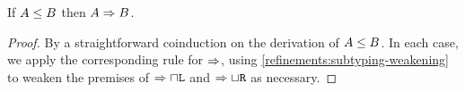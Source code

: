 \begin{theorem}
  If $A \le B$ then $A \mathrel\Rightarrow B$.
\end{theorem}
\begin{proof}
  By a straightforward coinduction on the derivation of $A \le B$. In each case, we apply the corresponding rule for $\mathrel\Rightarrow$, using \cref{refinements:subtyping-weakening} to weaken the premises of $\mathrel\Rightarrow{\mathbin{\sqcap}\texttt{L}}$ and $\mathrel\Rightarrow{\mathbin{\sqcup}\texttt{R}}$ as necessary.
\end{proof}

